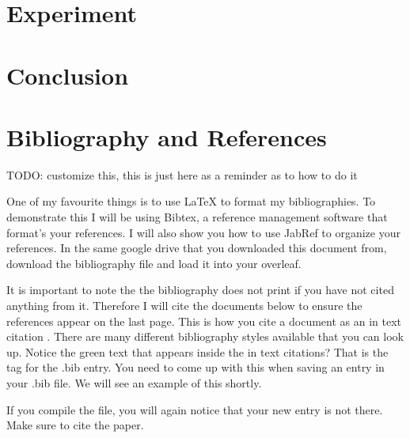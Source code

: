 \documentclass[paper=a4, fontsize=11pt]{scrartcl}
\numberwithin{equation}{section}		%
\numberwithin{table}{section}				%
\begin{document}
\section{Experiment}\label{sec: experiment}

\section{Conclusion}\label{sec: conlusion}

\section{Bibliography and References}\label{sec: bibliography}

TODO: customize this, this is just here as a reminder as to how to do it

One of my favourite things is to use \LaTeX{} to format my bibliographies. To demonstrate this I will be using Bibtex, a reference management software that format's your references. I will also show you how to use JabRef to organize your references. In the same google drive that you downloaded this document from, download the bibliography file and load it into your overleaf. 


It is important to note the the bibliography does not print if you have not cited anything from it. Therefore I will cite the documents below to ensure the references appear on the last page. This is how you cite a document as an in text citation \cite{LuTao2021Daco}. There are many different bibliography styles available that you can look up. Notice the green text that appears inside the in text citations? That is the tag for the .bib entry. You need to come up with this when saving an entry in your .bib file. We will see an example of this shortly. 


If you compile the file, you will again notice that your new entry is not there. Make sure to cite the paper. 

 
\clearpage
 




\end{document}
